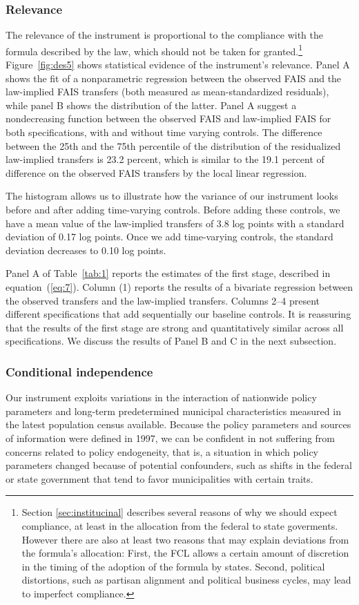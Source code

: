 \documentclass[dv_diss_main.tex]{subfiles}
\begin{document}
\subsubsection{Relevance} The relevance of the instrument is proportional to the compliance with the formula described by the law, which should not be taken for granted.\footnote{Section \ref{sec:institucinal} describes several reasons of why we should expect compliance, at least in the allocation from the federal to state goverments. However there are also at least two reasons that may explain deviations from the formula's allocation: First, the FCL allows a certain amount of discretion in the timing of the adoption of the formula by states. Second, political distortions, such as partisan alignment and political business cycles, may lead to imperfect compliance.} {Figure}~\ref{fig:des5} shows statistical evidence of the instrument’s relevance. Panel A shows the fit of a nonparametric regression between the observed FAIS and the law-implied FAIS transfers (both measured as mean-standardized residuals), while panel B shows the distribution of the latter. Panel A suggest a nondecreasing function between the observed FAIS and law-implied FAIS for both specifications, with and without time varying controls. The difference between the 25th and the 75th percentile of the distribution of the residualized law-implied transfers is 23.2 percent, which is similar to the 19.1 percent of difference on the observed FAIS transfers by the local linear regression.


The histogram allows us to illustrate how the variance of our instrument looks before and after adding time-varying controls. Before adding these controls, we have a mean value of the law-implied transfers of 3.8 log points with a standard deviation of 0.17 log points. Once we add time-varying controls, the standard deviation decreases to 0.10 log points.

Panel A of {Table}~\ref{tab:1} reports the estimates of the first stage, described in {equation}~(\ref{eq:7}). Column (1) reports the results of a bivariate regression between the observed transfers and the law-implied transfers. Columns 2–4 present different specifications that add sequentially our baseline controls. It is reassuring that the results of the first stage are strong and quantitatively similar across all specifications. We discuss the results of Panel B and C in the next subsection.


\subsubsection{Conditional independence} Our instrument exploits variations in the interaction of nationwide policy parameters and long-term predetermined municipal characteristics measured in the latest population census available. Because the policy parameters and sources of information were defined in 1997, we can be confident in not suffering from concerns related to policy endogeneity, that is, a situation in which policy parameters changed because of potential confounders, such as shifts in the federal or state government that tend to favor municipalities with certain traits.
\end{document}
